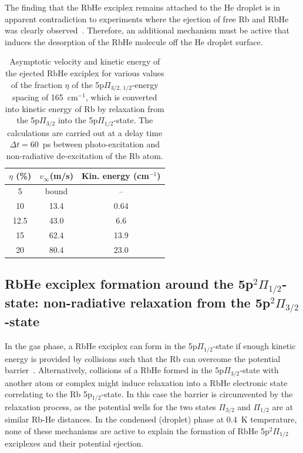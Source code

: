 The finding that the RbHe exciplex remains attached to the He droplet is in apparent contradiction to experiments where the ejection of free Rb and RbHe was clearly observed~\cite{Bruehl:2001,Droppelmann:2004,Fechner:2012}. Therefore, an additional mechanism must be active that induces the desorption of the RbHe molecule off the He droplet surface.

\begin{table}[!]
	\centering
	\vspace{0.1 cm}
	\begin{tabular}{ccc}
		\hline 
		$\eta$ (\%) &  $v_\infty$(m/s) & Kin. energy (cm$^{-1}$) \\ 
		\hline
		5   & bound & -- \\
		10  & 13.4  & 0.64\\ 
		12.5 & 43.0 & 6.6 \\
		15  & 62.4 & 13.9 \\ 
		20  & 80.4& 23.0 \\ 
		\hline 
	\end{tabular} 
	\caption{\label{tab1} 
	Asymptotic velocity and kinetic energy of the ejected RbHe exciplex for various values of the fraction $\eta$ of the 5p$\Pi_{3/2,\, 1/2}$-energy spacing of 165~cm$^{-1}$, which is converted into kinetic energy of Rb by relaxation from the 5p$\Pi_{3/2}$ into the 5p$\Pi_{1/2}$-state. The calculations are carried out at a delay time $\Delta t=60$~ps between photo-excitation and non-radiative de-excitation of the Rb atom.
} 
\end{table} 

\subsection{RbHe exciplex formation around the 5p$^2\Pi_{1/2}$-state: non-radiative relaxation from the 5p$^2\Pi_{3/2}$-state}
In the gas phase, a RbHe exciplex can form in the 5p$\Pi_{1/2}$-state if enough kinetic energy is provided by collisions such that the Rb can overcome the potential barrier~\cite{Hirano:2003}. Alternatively, collisions of a RbHe formed in the 5p$\Pi_{3/2}$-state with another atom or complex might induce relaxation into a RbHe electronic state correlating to the Rb 5p$_{1/2}$-state. In this case the barrier is circumvented by the relaxation process, as the potential wells for the two states $\Pi_{3/2}$ and $\Pi_{1/2}$ are at similar Rb-He distances. In the condensed (droplet) phase at 0.4~K temperature, none of these mechanisms are active to explain the formation of RbHe 5p$^2\Pi_{1/2}$ exciplexes and their potential ejection.    

